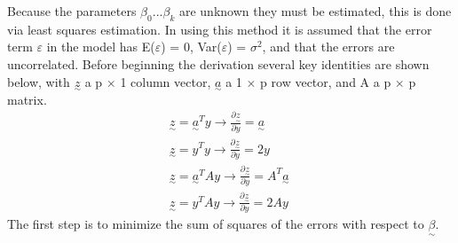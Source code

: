 \documentclass[12pt]{report}
\begin{document}
Because the parameters $\beta_{0} ... \beta_{k}$ are unknown they must be estimated, this is done via least squares estimation. In using this method it is assumed that the error term $\varepsilon$ in the model has E($\varepsilon$) = 0, Var($\varepsilon$) = $\sigma^2$, and that the errors are uncorrelated. Before beginning the derivation several key identities are shown below, with $\underset{\sim}z$ a p $\times$ 1 column vector, $\underset{\sim}a$ a 1 $\times$ p row vector, and A a p $\times$ p matrix.
\begin{equation*}
\begin{split}
    \underset{\sim}z = \underset{\sim}a^{T}y \longrightarrow \frac{\partial \underset{\sim}z}{\partial y} = \underset{\sim}a\phantom{i}
    \\
    \underset{\sim}z = y^{T}y \longrightarrow \frac{\partial \underset{\sim}z}{\partial y} = 2y
    \\
    \underset{\sim}z = \underset{\sim}a^{T}Ay \longrightarrow \frac{\partial \underset{\sim}z}{\partial y} = A^{T}\underset{\sim}a
    \\
    \underset{\sim}z = y^{T}Ay \longrightarrow \frac{\partial \underset{\sim}z}{\partial y} = 2Ay\phantom{i}
\end{split}
\end{equation*}
The first step is to minimize the sum of squares of the errors with respect to $\underset{\sim}\beta$.
\end{document}
